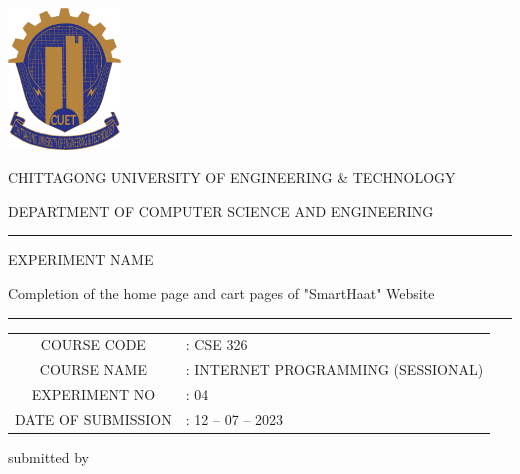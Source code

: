 \documentclass[a4paper,12pt]{report}
\begin{document}
\begin{titlepage}

	\centering

	\includegraphics[width=3cm, keepaspectratio]{cuet.png} \par \vspace{0.5cm}
	\begin{Large}
		CHITTAGONG UNIVERSITY OF ENGINEERING \& TECHNOLOGY
	\end{Large}
	\par
	\vspace{.5cm}
	{DEPARTMENT OF COMPUTER SCIENCE AND ENGINEERING}
\vspace{1cm}

	\raisebox{-\baselineskip}{\rule{\textwidth}{1px}}
	\rule{\textwidth}{1px}

\vspace{0.2cm}
{\Large{{EXPERIMENT NAME}}}\par \vspace{0.3cm}
\huge{{Completion of the home page and cart pages of "SmartHaat" Website}}
	\rule{\textwidth}{2px}

\vspace{0.5cm}

	\normalsize
\begin{tabular}{cl}
COURSE CODE        & : CSE 326                          \\
COURSE NAME        & : INTERNET PROGRAMMING (SESSIONAL) \\
EXPERIMENT NO      & : 04                               \\
DATE OF SUBMISSION & : 12 -- 07 -- 2023
\end{tabular}
\vspace{0.5cm}

	\parbox[l]{9cm}{
		\begin{center}
			submitted by
		\end{center}

}
\end{titlepage}
\end{document}
